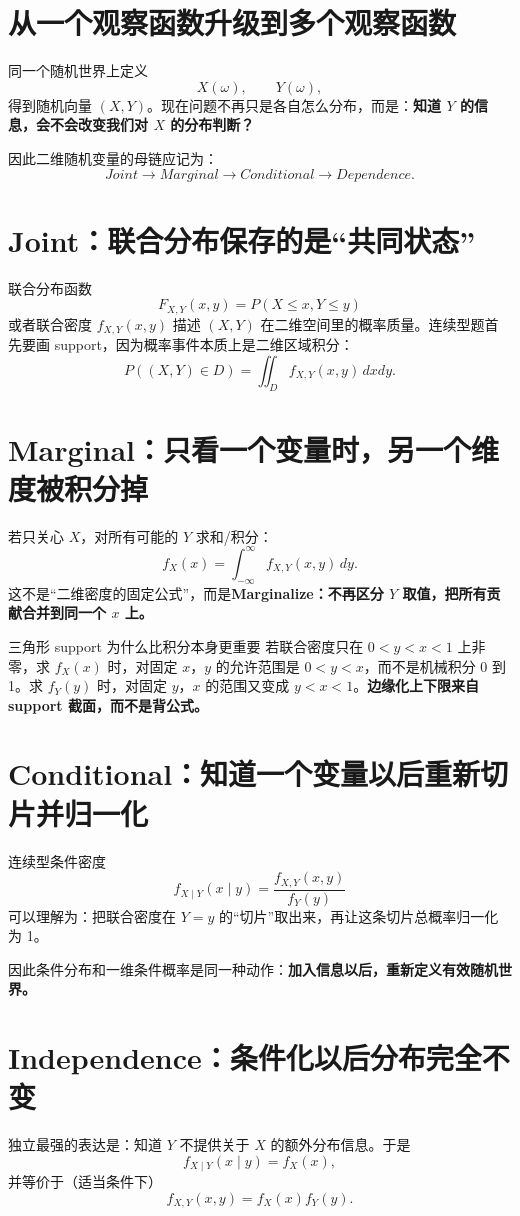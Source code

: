 \documentclass[11pt,a4paper,openany]{ctexbook}
\newcommand{\key}[1]{\textbf{\color{deep}#1}}
\begin{document}
\section{从一个观察函数升级到多个观察函数}
同一个随机世界上定义
\[
X(\omega),\qquad Y(\omega),
\]
得到随机向量 $(X,Y)$。现在问题不再只是各自怎么分布，而是：\key{知道 $Y$ 的信息，会不会改变我们对 $X$ 的分布判断？}

因此二维随机变量的母链应记为：
\[
\boxed{Joint\to Marginal\to Conditional\to Dependence.}
\]

\section{Joint：联合分布保存的是“共同状态”}
联合分布函数
\[
F_{X,Y}(x,y)=P(X\le x,Y\le y)
\]
或者联合密度 $f_{X,Y}(x,y)$ 描述 $(X,Y)$ 在二维空间里的概率质量。连续型题首先要画 support，因为概率事件本质上是二维区域积分：
\[
P((X,Y)\in D)=\iint_D f_{X,Y}(x,y)\,dxdy.
\]

\section{Marginal：只看一个变量时，另一个维度被积分掉}
若只关心 $X$，对所有可能的 $Y$ 求和/积分：
\[
f_X(x)=\int_{-\infty}^{\infty}f_{X,Y}(x,y)\,dy.
\]
这不是“二维密度的固定公式”，而是\key{Marginalize：不再区分 $Y$ 取值，把所有贡献合并到同一个 $x$ 上。}

\begin{examplebox}{三角形 support 为什么比积分本身更重要}
若联合密度只在 $0<y<x<1$ 上非零，求 $f_X(x)$ 时，对固定 $x$，$y$ 的允许范围是 $0<y<x$，而不是机械积分 $0$ 到 1。求 $f_Y(y)$ 时，对固定 $y$，$x$ 的范围又变成 $y<x<1$。\key{边缘化上下限来自 support 截面，而不是背公式。}
\end{examplebox}

\section{Conditional：知道一个变量以后重新切片并归一化}
连续型条件密度
\[
f_{X\mid Y}(x\mid y)=\frac{f_{X,Y}(x,y)}{f_Y(y)}
\]
可以理解为：把联合密度在 $Y=y$ 的“切片”取出来，再让这条切片总概率归一化为 1。

因此条件分布和一维条件概率是同一种动作：\key{加入信息以后，重新定义有效随机世界。}

\section{Independence：条件化以后分布完全不变}
独立最强的表达是：知道 $Y$ 不提供关于 $X$ 的额外分布信息。于是
\[
f_{X\mid Y}(x\mid y)=f_X(x),
\]
并等价于（适当条件下）
\[
f_{X,Y}(x,y)=f_X(x)f_Y(y).
\]
\end{document}
